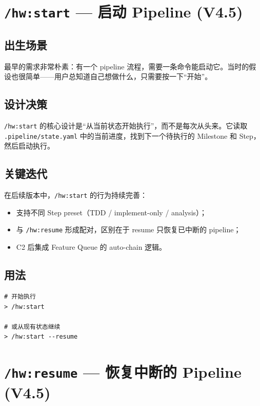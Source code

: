 \documentclass[
  outputdir=build,
  chapterstyle=cn,
  colorscheme=Simple,
  fontset=tech,
  code=false
]{Hypo-Note}
\begin{document}
\section{\texttt{/hw:start} — 启动 Pipeline (V4.5)}

\subsection{出生场景}

最早的需求非常朴素：有一个 pipeline 流程，需要一条命令能启动它。当时的假设也很简单——用户总知道自己想做什么，只需要按一下“开始”。

\subsection{设计决策}

\texttt{/hw:start} 的核心设计是“从当前状态开始执行”，而不是每次从头来。它读取 \texttt{.pipeline/state.yaml} 中的当前进度，找到下一个待执行的 Milestone 和 Step，然后启动执行。

\subsection{关键迭代}

在后续版本中，\texttt{/hw:start} 的行为持续完善：
\begin{itemize}[leftmargin=2em]
  \item 支持不同 Step preset（TDD / implement-only / analysis）；
  \item 与 \texttt{/hw:resume} 形成配对，区别在于 resume 只恢复已中断的 pipeline；
  \item C2 后集成 Feature Queue 的 auto-chain 逻辑。
\end{itemize}

\subsection{用法}

\begin{lstlisting}[caption=典型使用场景]
# 开始执行
> /hw:start

# 或从现有状态继续
> /hw:start --resume
\end{lstlisting}

\section{\texttt{/hw:resume} — 恢复中断的 Pipeline (V4.5)}
\end{document}
